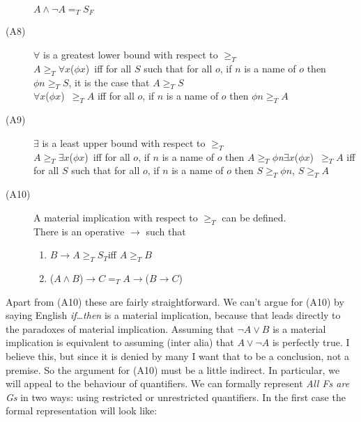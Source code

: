 \begin{description}
\(A \wedge \neg A =_T S_F\)
\item[(A8)] \(\forall\) is a greatest lower bound with respect to \(\geqslant _T\)  \hspace*{\fill} \\
\(A \geqslant _T \forall x\)(\(\phi x\))~iff for all \(S\) such that for all \(o\), if \(n\) is a name of \(o\) then \(\phi n \geqslant _T S\), it is the case that \(A \geqslant _T S\)  \hspace*{\fill} \\
\(\forall x\)(\(\phi x\))~\(\geqslant _T A\) iff for all \(o\), if \(n\) is a name of \(o\) then \(\phi n \geqslant _T A\)
\item[(A9)] \(\exists\) is a least upper bound with respect to \(\geqslant _T\)  \hspace*{\fill} \\
\(A \geqslant _T \exists x\)(\(\phi x\))~iff for all \(o\), if \(n\) is a name of \(o\) then \(A \geqslant _T \phi\)\textit{n}\(\exists x\)(\(\phi x\))~\(\geqslant _T A\) iff for all \(S\) such that for all \(o\), if \(n\) is a name of \(o\) then \(S \geqslant _T \phi n\), \(S \geqslant _T A\)
\item [(A10)] A material implication with respect to \(\geqslant _T\) can be defined.  \hspace*{\fill} \\
There is an operative \(\rightarrow\) such that 
\begin{enumerate}
\item \(B \rightarrow A \geqslant _T S_T\)iff \(A \geqslant _T B\)
\item (\(A \wedge B\))\( \rightarrow C =_T A  \rightarrow\)(\(B \rightarrow C\))
\end{enumerate}
\end{description}

\noindent Apart from (A10) these are fairly straightforward. We can't argue for (A10) by saying English \textit{if{\dots}then} is a material implication, because that leads directly to the paradoxes of material implication. Assuming that \(\neg A \vee B\) is a material implication is equivalent to assuming (inter alia) that \(A \vee \neg A\) is perfectly true. I believe this, but since it is denied by many I want that to be a conclusion, not a premise. So the argument for (A10) must be a little indirect. In particular, we will appeal to the behaviour of quantifiers. We can formally represent \textit{All Fs are Gs} in two ways: using restricted or unrestricted quantifiers. In the first case the formal representation will look like:

